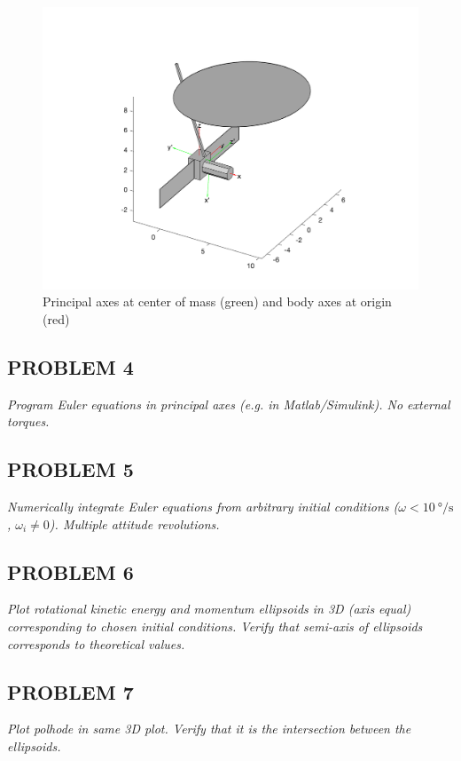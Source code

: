 \begin{figure}[H]
\centering
\includegraphics[scale=0.75]{Images/ps2_model.png}
\caption{Principal axes at center of mass (green) and body axes at origin (red)}
\label{fig:ps2_model}
\end{figure}


\subsection{PROBLEM 4}
\textit{Program Euler equations in principal axes (e.g. in Matlab/Simulink). No external torques.}




\subsection{PROBLEM 5}
\textit{Numerically integrate Euler equations from arbitrary initial conditions ($\omega<\qty{10}{\degree/\second}$, $\omega_{i}\neq0$). Multiple attitude revolutions.}


\subsection{PROBLEM 6}
\textit{Plot rotational kinetic energy and momentum ellipsoids in 3D (axis equal) corresponding to chosen initial conditions. Verify that semi-axis of ellipsoids corresponds to theoretical values.}


\subsection{PROBLEM 7}
\textit{Plot polhode in same 3D plot. Verify that it is the intersection between the ellipsoids.}


